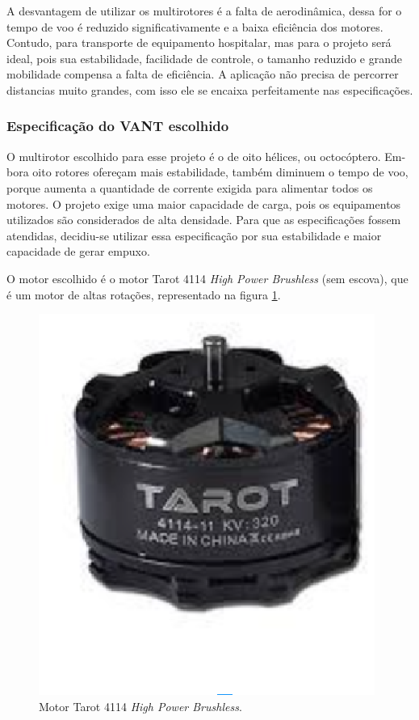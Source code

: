 A desvantagem de utilizar  os multirotores  é a  falta  de aerodinâmica,  dessa for o tempo de voo é reduzido significativamente e a baixa  
eficiência dos motores.  Contudo, para transporte de equipamento hospitalar, mas para o projeto será ideal, pois sua estabilidade, facilidade de
controle, o tamanho reduzido e grande mobilidade compensa a falta de eficiência. A aplicação não precisa de percorrer distancias muito grandes, 
com isso ele se encaixa perfeitamente nas especificações.
\subsubsection{Especificação do VANT escolhido}

O multirotor escolhido para esse projeto é o de oito hélices, ou octocóptero. Em- bora oito rotores ofereçam mais estabilidade, também diminuem 
o tempo de voo, porque aumenta a quantidade de corrente exigida para alimentar todos os motores.  O projeto exige uma maior capacidade de carga, pois os equipamentos utilizados são considerados de alta densidade. Para que as especificações fossem atendidas, decidiu-se utilizar essa especificação por sua estabilidade e maior capacidade de gerar empuxo.

O motor escolhido é o motor Tarot 4114 \textit{High Power Brushless} (sem escova), que é um motor de altas rotações, representado na figura 
\ref{fig:tarot2}.

\begin{figure}[H]
    \centering
      \includegraphics[keepaspectratio=true,scale=0.5]{figuras/tarot2.eps}
    \caption{Motor Tarot 4114 \textit{High Power Brushless}. \cite{tarot}}
    \label{fig:tarot2}
\end{figure}
\vfill

